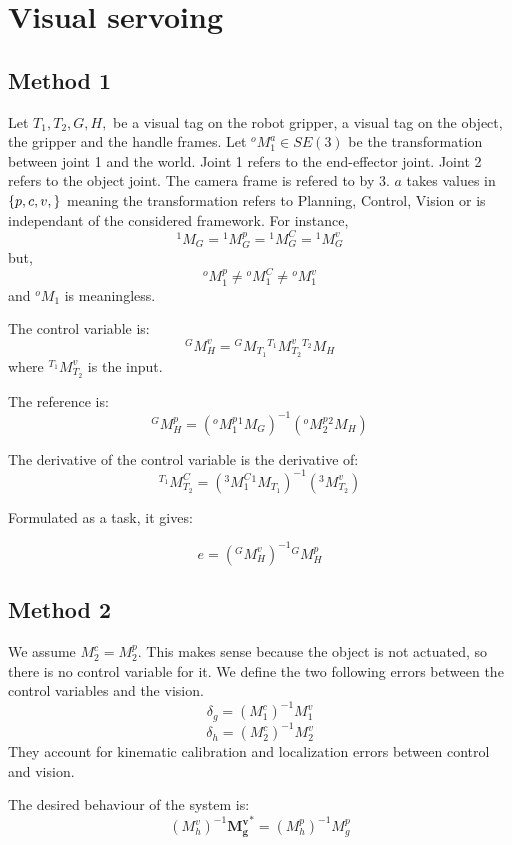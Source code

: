 \documentclass{article}
\newcommand{\oM}[2]{M^{#1}_{#2}}
\newcommand{\oMinv}[2]{{\left( \oM{#1}{#2} \right) }^{-1}}
\begin{document}
\section{Visual servoing}

\subsection{Method 1}

Let $T_1, T_2, G, H, $ be a visual tag on the robot gripper,
a visual tag on the object, the gripper and the handle frames.
Let ${^o}M^a_1 \in SE(3)$ be the transformation between joint 1 and the world.
Joint 1 refers to the end-effector joint.
Joint 2 refers to the object joint.
The camera frame is refered to by 3.
$a$ takes values in $\left\{ p, c, v, \empty \right\}$
meaning the transformation refers to Planning, Control, Vision or is independant of the considered framework.
For instance, $$ {^1}M_G = {^1}M^p_G = {^1}M^C_G = {^1}M^v_G $$
but, $$ {^o}M^p_1 \neq {^o}M^C_1 \neq {^o}M^v_1 $$ and ${^o}M_1 $ is meaningless.

The control variable is:
$$ {^G}M^v_H = {^G}M_{T_1} {^{T_1}}M^v_{T_2} {^{T_2}}M_H $$
where ${^{T_1}}M^v_{T_2} $ is the input.

The reference is:
$$ {^G}M^p_H = \left( {^o}M^p_{1} {^1}M_{G} \right)^{-1} \left( {^o}M^p_{2} {^2}M_{H} \right) $$

The derivative of the control variable is the derivative of:
$$ {^{T_1}}M^C_{T_2} = \left( {^3}M^C_{1} {^1}M_{T_1} \right)^{-1} \left( {^3}M^v_{T_2} \right) $$

Formulated as a task, it gives:

$$ e = \left( {^G}M^v_H \right)^{-1} {^G}M^p_H $$

\subsection{Method 2}

We assume $\oM{c}{2} = \oM{p}{2} $. This makes sense because the object is not actuated, so there is no control variable for it.
We define the two following errors between the control variables and the vision.
$$ \delta_g = \oMinv{c}{1} \oM{v}{1} $$
$$ \delta_h = \oMinv{c}{2} \oM{v}{2} $$
They account for kinematic calibration and localization errors between control and vision.

The desired behaviour of the system is:
$$ \oMinv{v}{h} {\bm{\oM{v}{g}}}^* = \oMinv{p}{h} {\oM{p}{g}} $$
\end{document}
